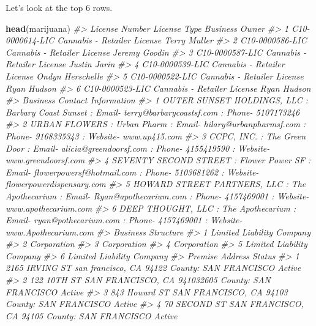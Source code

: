 \documentclass[
  12pt,
]{book}
\newenvironment{Shaded}{\begin{snugshade}}{\end{snugshade}}
\newcommand{\CommentTok}[1]{\textcolor[rgb]{0.56,0.35,0.01}{\textit{#1}}}
\newcommand{\KeywordTok}[1]{\textcolor[rgb]{0.13,0.29,0.53}{\textbf{#1}}}
\newcommand{\NormalTok}[1]{#1}
\begin{document}
Let's look at the top 6 rows.

\begin{Shaded}
\begin{Highlighting}[]
\KeywordTok{head}\NormalTok{(marijuana)}
\CommentTok{\#>    License Number                License Type   Business Owner}
\CommentTok{\#> 1 C10{-}0000614{-}LIC Cannabis {-} Retailer License     Terry Muller}
\CommentTok{\#> 2 C10{-}0000586{-}LIC Cannabis {-} Retailer License    Jeremy Goodin}
\CommentTok{\#> 3 C10{-}0000587{-}LIC Cannabis {-} Retailer License     Justin Jarin}
\CommentTok{\#> 4 C10{-}0000539{-}LIC Cannabis {-} Retailer License Ondyn Herschelle}
\CommentTok{\#> 5 C10{-}0000522{-}LIC Cannabis {-} Retailer License      Ryan Hudson}
\CommentTok{\#> 6 C10{-}0000523{-}LIC Cannabis {-} Retailer License      Ryan Hudson}
\CommentTok{\#>                                                                                                           Business Contact Information}
\CommentTok{\#> 1                             OUTER SUNSET HOLDINGS, LLC  : Barbary Coast Sunset : Email{-} terry@barbarycoastsf.com : Phone{-} 5107173246}
\CommentTok{\#> 2                           URBAN FLOWERS  : Urban Pharm : Email{-} hilary@urbanpharmsf.com : Phone{-} 9168335343 : Website{-} www.up415.com}
\CommentTok{\#> 3                      CCPC, INC.  : The Green Door : Email{-} alicia@greendoorsf.com : Phone{-} 4155419590 : Website{-} www.greendoorsf.com}
\CommentTok{\#> 4 SEVENTY SECOND STREET  : Flower Power SF : Email{-} flowerpowersf@hotmail.com : Phone{-} 5103681262 : Website{-} flowerpowerdispensary.com}
\CommentTok{\#> 5   HOWARD STREET PARTNERS, LLC  : The Apothecarium : Email{-} Ryan@apothecarium.com : Phone{-} 4157469001 : Website{-} www.apothecarium.com}
\CommentTok{\#> 6              DEEP THOUGHT, LLC  : The Apothecarium : Email{-} ryan@pothecarium.com : Phone{-} 4157469001 : Website{-} www.Apothecarium.com}
\CommentTok{\#>          Business Structure}
\CommentTok{\#> 1 Limited Liability Company}
\CommentTok{\#> 2               Corporation}
\CommentTok{\#> 3               Corporation}
\CommentTok{\#> 4               Corporation}
\CommentTok{\#> 5 Limited Liability Company}
\CommentTok{\#> 6 Limited Liability Company}
\CommentTok{\#>                                                 Premise Address Status}
\CommentTok{\#> 1  2165 IRVING ST san francisco, CA 94122 County: SAN FRANCISCO Active}
\CommentTok{\#> 2 122 10TH ST SAN FRANCISCO, CA 941032605 County: SAN FRANCISCO Active}
\CommentTok{\#> 3   843 Howard ST SAN FRANCISCO, CA 94103 County: SAN FRANCISCO Active}
\CommentTok{\#> 4    70 SECOND ST SAN FRANCISCO, CA 94105 County: SAN FRANCISCO Active}

\end{Highlighting}
\end{Shaded}
\end{document}
